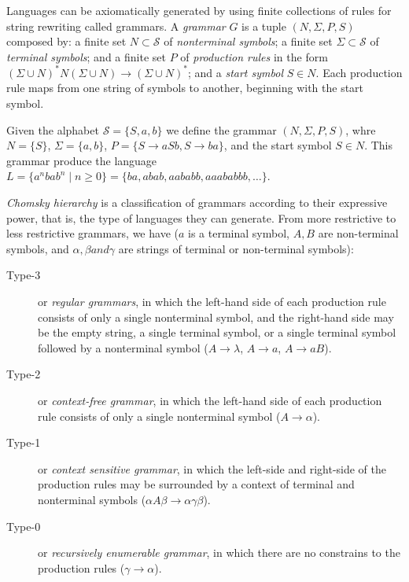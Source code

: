 Languages can be axiomatically generated by using finite collections of rules for string rewriting called grammars. A \emph{grammar} $G$ is a tuple $(N, \Sigma, P, S)$ composed by: a finite set $N \subset \mathcal{S}$ of \emph{nonterminal symbols}; a finite set $\Sigma \subset \mathcal{S}$ of \emph{terminal symbols}; and a finite set $P$ of \emph{production rules} in the form $( \Sigma \cup N )^\ast N ( \Sigma \cup N) \rightarrow (\Sigma \cup N)^\ast$; and a \emph{start symbol} $S \in N$. Each production rule maps from one string of symbols to another, beginning with the start symbol.

\begin{example}
\label{ex:context_free_grammar}
Given the alphabet $\mathcal{S} = \{ S, a, b \}$ we define the grammar $(N, \Sigma, P, S)$, whre $N = \{ S \}$, $\Sigma = \{ a, b \}$, $P = \{ S \rightarrow aSb, S \rightarrow ba \}$, and the start symbol $S \in N$. This grammar produce the language $L = \{ a^nbab^n \mid n\geq0 \} = \{ ba, abab, aababb, aaababbb, \ldots \}$.
\end{example}

\emph{Chomsky hierarchy} is a classification of grammars according to their expressive power, that is, the type of languages they can generate. From more restrictive to less restrictive grammars, we have ($a$ is a terminal symbol, $A, B$ are non-terminal symbols, and $\alpha, \beta and \gamma$ are strings of terminal or non-terminal symbols):

\begin{description}
\item[Type-3] or \emph{regular grammars}, in which the left-hand side of each production rule consists of only a single nonterminal symbol, and the right-hand side may be the empty string, a single terminal symbol, or a single terminal symbol followed by a nonterminal symbol ($A \rightarrow \lambda$, $A \rightarrow a$, $A \rightarrow aB$).

\item[Type-2] or \emph{context-free grammar}, in which the left-hand side of each production rule consists of only a single nonterminal symbol ($A \rightarrow \alpha$). 

\item[Type-1] or \emph{context sensitive grammar}, in which the left-side and right-side of the production rules may be surrounded by a context of terminal and nonterminal symbols ($\alpha A \beta \rightarrow \alpha \gamma \beta$).

\item[Type-0] or \emph{recursively enumerable grammar}, in which there are no constrains to the production rules ($\gamma \rightarrow \alpha$).
\end{description}

